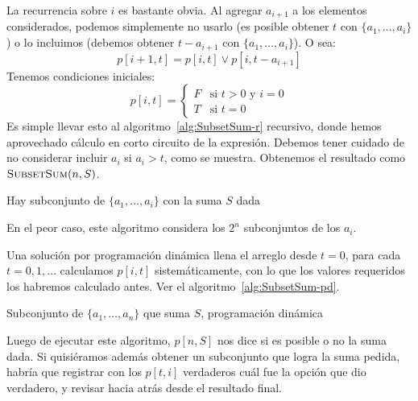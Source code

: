   La recurrencia sobre \(i\) es bastante obvia.
  Al agregar \(a_{i + 1}\) a los elementos considerados,
  podemos simplemente no usarlo
  (es posible obtener \(t\) con \(\{a_1, \dotsc, a_i\}\))
  o lo incluimos
  (debemos obtener \(t - a_{i + 1}\) con \(\{a_1, \dotsc, a_i\}\)).
  O sea:
  \begin{equation*}
    p[i + 1, t]
      = p[i, t] \vee p[i, t - a_{i + 1}]
  \end{equation*}
  Tenemos condiciones iniciales:
  \begin{equation*}
    p[i, t]
      = \begin{cases}
	  F & \text{si \(t > 0\) y \(i = 0\)} \\
	  T & \text{si \(t = 0\)}
	\end{cases}
  \end{equation*}
  Es simple llevar esto al algoritmo~\ref{alg:SubsetSum-r} recursivo,
  donde hemos aprovechado cálculo en corto circuito de la expresión.
  Debemos tener cuidado de no considerar incluir \(a_i\) si \(a_i > t\),
  como se muestra.
  Obtenemos el resultado como \(\mathrm{\textsc{SubsetSum}}(n, S)\).
  \begin{algorithm}[htbp]
    \DontPrintSemicolon\Indp

    \caption{Hay subconjunto de \(\{a_1, \dotsc, a_i\}\)
	     con la suma \(S\) dada}
    \label{alg:SubsetSum-r}
  \end{algorithm}
  En el peor caso,
  este algoritmo considera los \(2^n\) subconjuntos de los \(a_i\).

  Una solución por programación dinámica llena el arreglo
  desde \(t = 0\),
  para cada \(t = 0, 1, \dotsc\) calculamos \(p[i, t]\)
  sistemáticamente,
  con lo que los valores requeridos los habremos calculado antes.
  Ver el algoritmo~\ref{alg:SubsetSum-pd}.
  \begin{algorithm}[htb]
    \DontPrintSemicolon\Indp

    \caption{Subconjunto de \(\{a_1, \dotsc, a_n\}\)
	     que suma \(S\),
	     programación dinámica}
    \label{alg:SubsetSum-pd}
  \end{algorithm}
  Luego de ejecutar este algoritmo,
  \(p[n, S]\) nos dice si es posible o no la suma dada.
  Si quisiéramos además obtener un subconjunto que logra la suma pedida,
  habría que registrar con los \(p[t, i]\) verdaderos
  cuál fue la opción que dio verdadero,
  y revisar hacia atrás desde el resultado final.

